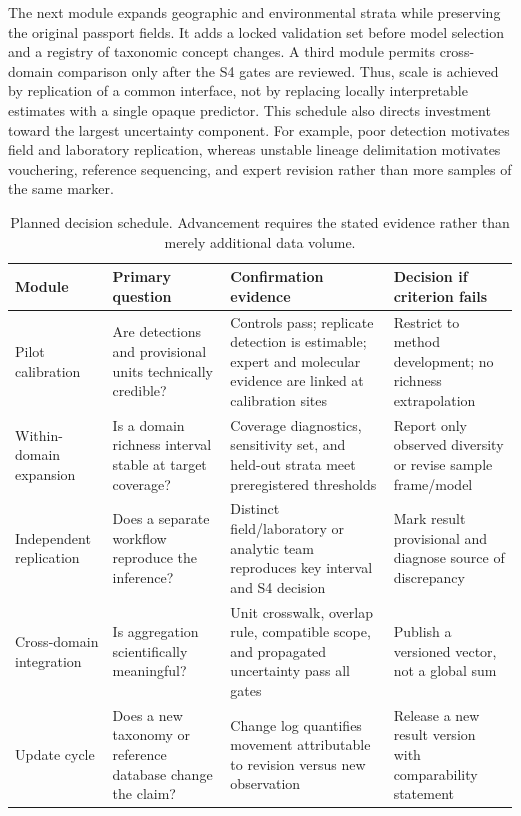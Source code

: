 \documentclass[conference]{IEEEtran}
\begin{document}
The next module expands geographic and environmental strata while preserving the original passport fields. It adds a locked validation set before model selection and a registry of taxonomic concept changes. A third module permits cross-domain comparison only after the S4 gates are reviewed. Thus, scale is achieved by replication of a common interface, not by replacing locally interpretable estimates with a single opaque predictor. This schedule also directs investment toward the largest uncertainty component. For example, poor detection motivates field and laboratory replication, whereas unstable lineage delimitation motivates vouchering, reference sequencing, and expert revision rather than more samples of the same marker.

\begin{table}[t]
\caption{Planned decision schedule. Advancement requires the stated evidence rather than merely additional data volume.}
\label{tab:schedule}
\centering
\footnotesize
\begin{tabular}{L{0.15\textwidth} L{0.23\textwidth} L{0.25\textwidth} L{0.25\textwidth}}
\toprule
\textbf{Module} & \textbf{Primary question} & \textbf{Confirmation evidence} & \textbf{Decision if criterion fails}\\
\midrule
Pilot calibration & Are detections and provisional units technically credible? & Controls pass; replicate detection is estimable; expert and molecular evidence are linked at calibration sites & Restrict to method development; no richness extrapolation\\
Within-domain expansion & Is a domain richness interval stable at target coverage? & Coverage diagnostics, sensitivity set, and held-out strata meet preregistered thresholds & Report only observed diversity or revise sample frame/model\\
Independent replication & Does a separate workflow reproduce the inference? & Distinct field/laboratory or analytic team reproduces key interval and S4 decision & Mark result provisional and diagnose source of discrepancy\\
Cross-domain integration & Is aggregation scientifically meaningful? & Unit crosswalk, overlap rule, compatible scope, and propagated uncertainty pass all gates & Publish a versioned vector, not a global sum\\
Update cycle & Does a new taxonomy or reference database change the claim? & Change log quantifies movement attributable to revision versus new observation & Release a new result version with comparability statement\\
\bottomrule
\end{tabular}
\end{table}
\end{document}
